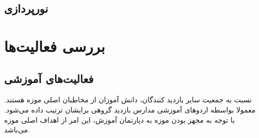 \subsection{نورپردازی}



\section{بررسی فعالیت‌ها}

\subsection{فعالیت‌های آموزشی}
نسبت به جمعیت سایر بازدید کنندگان، دانش آموزان از مخاطبان اصلی موزه هستند. معمولا بواسطه اردوهای آموزشی مدارس بازدید گروهی برایشان ترتیب داده می‌شود.
با توجه به مجهز بودن موزه به دپارتمان آموزش، این امر از اهداف اصلی موزه می‌باشد. 




